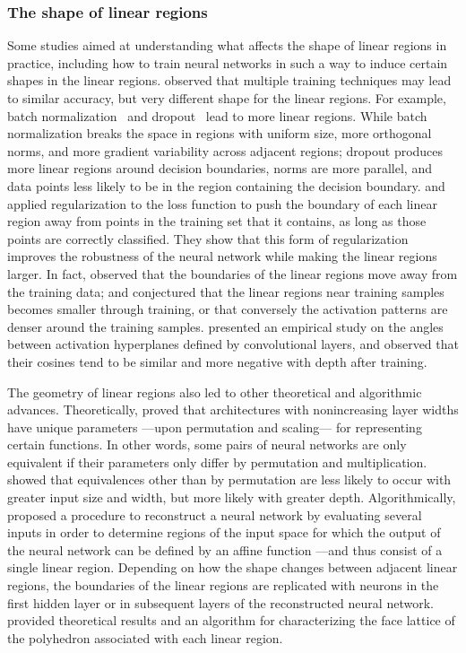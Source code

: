 \subsubsection{The shape of linear regions}

Some studies aimed at understanding what affects the shape of linear regions in practice, including how to train neural networks in such a way to induce certain shapes in the linear regions. 
%
\cite{empirical2020iclr} observed that multiple training techniques may lead to similar accuracy, but very different shape for the linear regions. 
For example, batch normalization~\citep{ioffe2015batchnorm} and dropout~\citep{srivastava2014dropout} lead to more linear regions. 
While batch normalization breaks the space in regions with uniform size, more orthogonal norms, and more gradient variability across adjacent regions; dropout produces more linear regions around decision boundaries, norms are more parallel, and data points less likely to be in the region containing the decision boundary. 
\cite{croce2019max} and \cite{LocallyLinear} applied regularization to the loss function to push the boundary of each linear region away from points in the training set that it contains, as long as those points are correctly classified. They show that this form of regularization improves the robustness of the neural network while making the linear regions larger.
In fact, \cite{zhu2020local} observed that the boundaries of the linear regions move away from the training data; 
and \cite{HashEncoders} conjectured that the linear regions near training samples becomes smaller through training, or that conversely the activation patterns are denser around the training samples. 
\cite{gamba2020biased} presented an empirical study on the angles between activation hyperplanes defined by convolutional layers, and observed that their cosines tend to be similar and more negative with depth after training.

The geometry of linear regions also led to other theoretical and algorithmic advances. 
Theoretically, \cite{phuong2020equivalence} proved that architectures with nonincreasing layer widths have unique parameters ---upon permutation and scaling--- for representing certain functions. 
In other words, some pairs of neural networks are only equivalent if their parameters only differ by permutation and multiplication. 
\cite{grigsby2023symmetries} showed that equivalences other than by permutation are less likely to occur with greater input size and width, but more likely with greater depth.
Algorithmically, 
\cite{ReverseEngineering} proposed a procedure to reconstruct a neural network by evaluating several inputs in order to determine regions of the input space 
for which the output of the neural network can be defined by an affine function ---and thus consist of a single linear region. 
Depending on how the shape changes between adjacent linear regions, 
the boundaries of the linear regions are replicated with neurons in the first hidden layer or in subsequent layers of the reconstructed neural network. 
\cite{masden2022combinatorial} provided theoretical results and an algorithm for characterizing the face lattice of the polyhedron associated with each linear region. 


